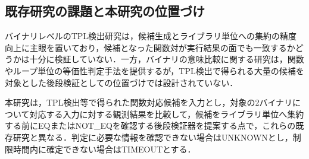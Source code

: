 \subsection{既存研究の課題と本研究の位置づけ}
バイナリレベルのTPL検出研究は，候補生成とライブラリ単位への集約の精度向上に主眼を置いており，候補となった関数対が実行結果の面でも一致するかどうかは十分に検証していない．一方，バイナリの意味比較に関する研究は，関数やループ単位の等価性判定手法を提供するが，TPL検出で得られる大量の候補を対象とした後段検証としての位置づけでは設計されていない．

本研究は，TPL検出等で得られた関数対応候補を入力とし，対象の2バイナリについて対応する入力に対する観測結果を比較して，候補をライブラリ単位へ集約する前にEQまたはNOT\_EQを確認する後段検証器を提案する点で，これらの既存研究と異なる．判定に必要な情報を確認できない場合はUNKNOWNとし，制限時間内に確定できない場合はTIMEOUTとする．
